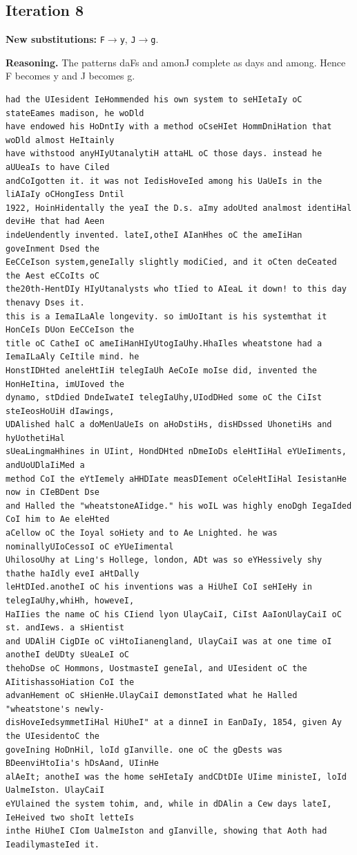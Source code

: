 \documentclass[12pt,a4paper]{article}
\begin{document}
\subsection{Iteration 8}

\noindent\textbf{New substitutions:} \texttt{F}$\rightarrow$\texttt{y}, \texttt{J}$\rightarrow$\texttt{g}.\par
\smallskip
\noindent\textbf{Reasoning.} The patterns daFs and amonJ complete as days and among. Hence F becomes y and J becomes g.

\begin{lstlisting}[style=ciphertext,caption={Complete text after iteration 8}]
had the UIesident IeHommended his own system to seHIetaIy oC stateEames madison, he woDld
have endowed his HoDntIy with a method oCseHIet HommDniHation that woDld almost HeItainly
have withstood anyHIyUtanalytiH attaHL oC those days. instead he aUUeaIs to have Ciled
andCoIgotten it. it was not IedisHoveIed among his UaUeIs in the liAIaIy oCHongIess Dntil
1922, HoinHidentally the yeaI the D.s. aImy adoUted analmost identiHal deviHe that had Aeen
indeUendently invented. lateI,otheI AIanHhes oC the ameIiHan goveInment Dsed the
EeCCeIson system,geneIally slightly modiCied, and it oCten deCeated the Aest eCCoIts oC
the20th-HentDIy HIyUtanalysts who tIied to AIeaL it down! to this day thenavy Dses it.
this is a IemaILaAle longevity. so imUoItant is his systemthat it HonCeIs DUon EeCCeIson the
title oC CatheI oC ameIiHanHIyUtogIaUhy.HhaIles wheatstone had a IemaILaAly CeItile mind. he
HonstIDHted aneleHtIiH telegIaUh AeCoIe moIse did, invented the HonHeItina, imUIoved the
dynamo, stDdied DndeIwateI telegIaUhy,UIodDHed some oC the CiIst steIeosHoUiH dIawings,
UDAlished halC a doMenUaUeIs on aHoDstiHs, disHDssed UhonetiHs and hyUothetiHal
sUeaLingmaHhines in UIint, HondDHted nDmeIoDs eleHtIiHal eYUeIiments, andUoUDlaIiMed a
method CoI the eYtIemely aHHDIate measDIement oCeleHtIiHal IesistanHe now in CIeBDent Dse
and Halled the "wheatstoneAIidge." his woIL was highly enoDgh IegaIded CoI him to Ae eleHted
aCellow oC the Ioyal soHiety and to Ae Lnighted. he was nominallyUIoCessoI oC eYUeIimental
UhilosoUhy at Ling's Hollege, london, ADt was so eYHessively shy thathe haIdly eveI aHtDally
leHtDIed.anotheI oC his inventions was a HiUheI CoI seHIeHy in telegIaUhy,whiHh, howeveI,
HaIIies the name oC his CIiend lyon UlayCaiI, CiIst AaIonUlayCaiI oC st. andIews. a sHientist
and UDAliH CigDIe oC viHtoIianengland, UlayCaiI was at one time oI anotheI deUDty sUeaLeI oC
thehoDse oC Hommons, UostmasteI geneIal, and UIesident oC the AIitishassoHiation CoI the
advanHement oC sHienHe.UlayCaiI demonstIated what he Halled "wheatstone's newly-
disHoveIedsymmetIiHal HiUheI" at a dinneI in EanDaIy, 1854, given Ay the UIesidentoC the
goveIning HoDnHil, loId gIanville. one oC the gDests was BDeenviHtoIia's hDsAand, UIinHe
alAeIt; anotheI was the home seHIetaIy andCDtDIe UIime ministeI, loId UalmeIston. UlayCaiI
eYUlained the system tohim, and, while in dDAlin a Cew days lateI, IeHeived two shoIt letteIs
inthe HiUheI CIom UalmeIston and gIanville, showing that Aoth had IeadilymasteIed it.
\end{lstlisting}
\end{document}
